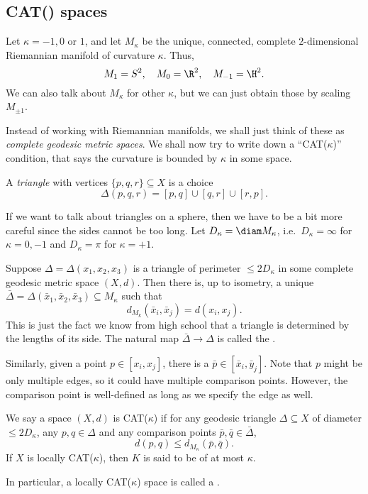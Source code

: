 \documentclass[a4paper]{article}
\begin{document}
\subsection{CAT() spaces}
Let $\kappa = -1, 0$ or $1$, and let $M_\kappa$ be the unique, connected, complete $2$-dimensional Riemannian manifold of curvature $\kappa$. Thus,
\[
  M_1 = S^2,\quad M_0 = \R^2,\quad M_{-1} = \H^2.
\]
We can also talk about $M_\kappa$ for other $\kappa$, but we can just obtain those by scaling $M_{\pm 1}$.

Instead of working with Riemannian manifolds, we shall just think of these as \emph{complete geodesic metric spaces}. We shall now try to write down a ``CAT($\kappa$)'' condition, that says the curvature is bounded by $\kappa$ in some space.

\begin{defi}[Triangle]
  A \emph{triangle} with vertices $\{p, q, r\} \subseteq X$ is a choice
  \[
    \Delta(p, q, r) = [p, q] \cup [q, r] \cup [r, p].
  \]
\end{defi}
If we want to talk about triangles on a sphere, then we have to be a bit more careful since the sides cannot be too long. Let $D_\kappa = \diam M_\kappa$, i.e.\ $D_\kappa = \infty$ for $\kappa = 0, -1$ and $D_\kappa = \pi$ for $\kappa = +1$.

Suppose $\Delta = \Delta(x_1, x_2, x_3)$ is a triangle of perimeter $\leq 2 D_\kappa$ in some complete geodesic metric space $(X, d)$. Then there is, up to isometry, a unique  $\bar{\Delta} = \Delta(\bar{x}_1, \bar{x}_2, \bar{x}_3) \subseteq M_\kappa$ such that
\[
  d_{M_k}(\bar{x}_i, \bar{x}_j) = d(x_i, x_j).
\]
This is just the fact we know from high school that a triangle is determined by the lengths of its side. The natural map $\bar{\Delta} \to \Delta$ is called the .

Similarly, given a point $p \in [x_i, x_j]$, there is a  $\bar{p} \in [\bar{x}_i, \bar{y}_j]$. Note that $p$ might be only multiple edges, so it could have multiple comparison points. However, the comparison point is well-defined as long as we specify the edge as well.

\begin{defi} %
  We say a space $(X, d)$ is CAT($\kappa$) if for any geodesic triangle $\Delta \subseteq X$ of diameter $\leq 2 D_\kappa$, any $p, q \in \Delta$ and any comparison points $\bar{p}, \bar{q} \in \bar{\Delta}$,
  \[
    d(p, q) \leq d_{M_\kappa} (\bar{p}, \bar{q}).
  \]
  If $X$ is locally CAT($\kappa$), then $K$ is said to be of  at most $\kappa$.

  In particular, a locally CAT($\kappa$) space is called a .
\end{defi}
\end{document}

